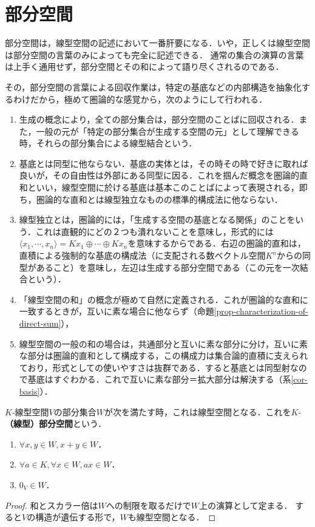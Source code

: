 \documentclass[uplatex, 12pt, dvipdfmx]{jsreport}
\begin{document}
\section{部分空間}

\begin{screen}
    部分空間は，線型空間の記述において一番肝要になる．いや，正しくは線型空間は部分空間の言葉のみによっても完全に記述できる．
    通常の集合の演算の言葉は上手く通用せず，部分空間とその和によって語り尽くされるのである．

    その，部分空間の言葉による回収作業は，特定の基底などの内部構造を抽象化するわけだから，極めて圏論的な感覚から，次のようにして行われる．
    \begin{enumerate}
        \item 生成の概念により，全ての部分集合は，部分空間のことばに回収される．また，一般の元が「特定の部分集合が生成する空間の元」として理解できる時，それらの部分集合による線型結合という．
        \item 基底とは同型に他ならない．基底の実体とは，その時その時で好きに取れば良いが，その自由性は外部にある同型に因る．これを掴んだ概念を圏論的直和といい，線型空間に於ける基底は基本このことばによって表現される，即ち，圏論的な直和とは線型独立なものの標準的構成法に他ならない．
        \item 線型独立とは，圏論的には，「生成する空間の基底となる関係」のことをいう．これは直観的にどの２つも潰れないことを意味し，形式的には$\langle x_1,\cdots,x_n\rangle=Kx_1\oplus\cdots\oplus Kx_n$を意味するからである．右辺の圏論的直和は，直積による強制的な基底の構成法（に支配される数ベクトル空間$K^n$からの同型があること）を意味し，左辺は生成する部分空間である（この元を一次結合という）．
        \item 「線型空間の和」の概念が極めて自然に定義される．これが圏論的な直和に一致するときが，互いに素な場合に他ならず（命題\ref{prop-characterization-of-direct-sum}），
        \item 線型空間の一般の和の場合は，共通部分と互いに素な部分に分け，互いに素な部分は圏論的直和として構成する，この構成力は集合論的直積に支えられており，形式としての使いやすさは抜群である．すると基底とは同型射なので基底はすぐわかる．これで互いに素な部分＝拡大部分は解決する（系\ref{cor-basis}）．
    \end{enumerate}
\end{screen}

\begin{definition}[subspace]
    $K$-線型空間$V$の部分集合$W$が次を満たす時，これは線型空間となる．これを$K$-\textbf{（線型）部分空間}という．
    \begin{enumerate}
        \item $\forall x,y\in W, x+y\in W$．
        \item $\forall  a\in K,  \forall x\in  W, ax \in W$．
        \item $0_V\in W$．
    \end{enumerate}
\end{definition}
\begin{proof}
    和とスカラー倍は$W$への制限を取るだけで$W$上の演算として定まる．
    すると$V$の構造が遺伝する形で，$W$も線型空間となる．
\end{proof}
\end{document}

